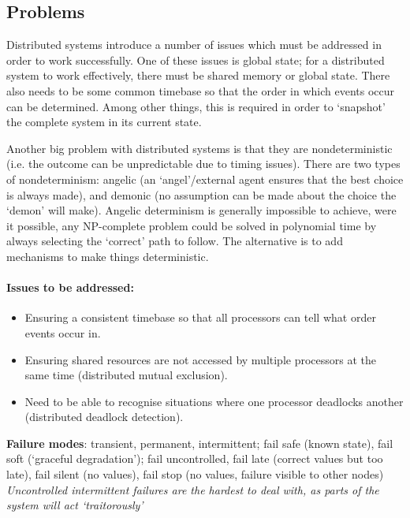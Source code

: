 \documentclass[a4paper,oneside]{report}
\begin{document}
   	\subsection{Problems}
   	
   	Distributed systems introduce a number of issues which must be addressed in order to work successfully.  One of these issues is global state; for a distributed system to work effectively, there must be shared memory or global state. There also needs to be some common timebase so that the order in which events occur can be determined. Among other things, this is required in order to `snapshot' the complete system in its current state.
   	
	Another big problem with distributed systems is that they are nondeterministic (i.e. the outcome can be unpredictable due to timing issues). There are two types of nondeterminism: angelic (an ‘angel’/external agent ensures that the best choice is always made), and demonic (no assumption can be made about the choice the ‘demon’ will make). Angelic determinism is generally impossible to achieve, were it possible, any NP-complete problem could be solved in polynomial time by always selecting the ‘correct’ path to follow. The alternative is to add mechanisms to make things deterministic.   
   	
   		\paragraph{Issues to be addressed:}
		\begin{itemize}
			\item Ensuring a consistent timebase so that all processors can tell what order events occur in.
			\item Ensuring shared resources are not accessed by multiple processors at the same time (distributed mutual exclusion).
			\item Need to be able to recognise situations where one processor deadlocks another (distributed deadlock detection).
		\end{itemize}
   	
   	\textbf{Failure modes}: transient, permanent, intermittent; fail safe (known state), fail soft (‘graceful degradation’); fail uncontrolled, fail late (correct values but too late), fail silent (no values), fail stop (no values, failure visible to other nodes)
   	\emph{Uncontrolled intermittent failures are the hardest to deal with, as parts of the system will act `traitorously'}
\end{document}
